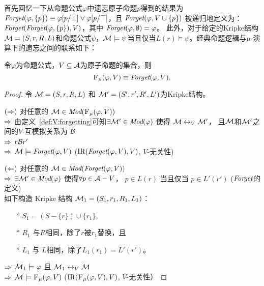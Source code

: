 首先回忆一下从命题公式$\varphi$中遗忘原子命题$p$得到的结果为$\textit{Forget}(\varphi, \{p\})\equiv \varphi[p/\bot] \vee \varphi[p/\top]$，且 $\textit{Forget}(\varphi, V\cup \{p\})$ 被递归地定义为： $\textit{Forget}(\textit{Forget}(\varphi, \{p\}),V)$，其中 $\textit{Forget}(\varphi, \emptyset) = \varphi$。
此外，对于给定的Kripke结构${\cal M} = (S, r, R, L)$和命题公式$\psi$，${\cal M} \models  \psi$当且仅当$L(r) \models \psi$。经典命题逻辑与$\mu$-演算下的遗忘之间的联系如下：
\begin{theorem}\label{thm:PL:CTL}
	令$\varphi$为命题公式，$V\subseteq {\cal A}$为原子命题的集合，则
	\[
	{\textsc{F}_{\textsc{$\mu$}}}(\varphi, V) \equiv \textit{Forget}(\varphi, V).
	\]
\end{theorem}
\begin{proof}
	令 ${\cal M} = (S, r, R, L)$ 和 ${\cal M}' = (S', r', R', L')$为Kripke结构。
	
	$(\Rightarrow)$ 对任意的 ${\cal M} \in \textit{Mod}({\textsc{F}_{\textsc{$\mu$}}}(\varphi, V))$ \\
	$\Rightarrow$ 由定义~\ref{def:V:forgetting}可知$\exists {\cal M}' \in \textit{Mod}(\varphi)$ 使得 ${\cal M} \leftrightarrow_V {\cal M}'$， %
	 且${\cal M}$和${\cal M}'$之间的$V$-互模拟关系为 ${\cal B}$\\
	$\Rightarrow$ $r {\cal B} r'$ \\
	$\Rightarrow$ ${\cal M} \models \textit{Forget}(\varphi, V)$ \hfill ($\textrm{IR}(\textit{Forget}(\varphi, V),V)$, $V$-无关性)
	
	$(\Leftarrow)$ 对任意的 ${\cal M} \in \textit{Mod}(\textit{Forget}(\varphi, V))$ \\
	$\Rightarrow$ $\exists {\cal M}' \in\textit{Mod}(\varphi)$ 使得$\forall p \in {\cal A}-V$， $p \in L(r)$ 当且仅当 $p \in L'(r')$ \hfill ($\textit{Forget}$的定义)\\
	
	如下构造 Kripke 结构 ${\cal M}_1 = (S_1, r_1, R_1, L_1)$：
	\begin{itemize}
		\item[*] $S_1 = (S - \{r\}) \cup \{r_1\}$,
		\item[*] $R_1$ 与$R$相同，除了$r$被$r_1$替换，且
		\item[*] $L_1$ 与 $L$相同，除了$L_1(r_1) = L'(r')$。
	\end{itemize}
	$\Rightarrow$ ${\cal M}_1 \models \varphi$ 且 ${\cal M}_1 \leftrightarrow_V {\cal M}$\\
	$\Rightarrow$ ${\cal M} \models {\textsc{F}_{\textsc{$\mu$}}}(\varphi, V)$ \hfill ($\textrm{IR}({\textsc{F}_{\textsc{$\mu$}}}(\varphi, V), V)$, $V$-无关性）
\end{proof}

